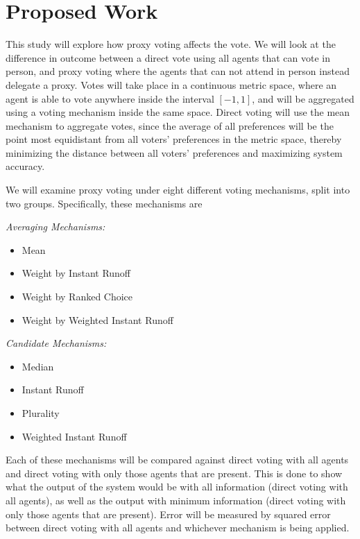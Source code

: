\section{Proposed Work}\label{sec:contribution}
This study will explore how proxy voting affects the vote.
We will look at the difference in outcome between a direct vote using all agents that
can vote in person, and proxy voting where the agents that can not attend in person
instead delegate a proxy.
Votes will take place in a continuous metric space, where an agent is able to vote
anywhere inside the interval $[-1, 1]$, and will be aggregated using a voting
mechanism inside the same space.
Direct voting will use the mean mechanism to aggregate votes, since the average of
all preferences will be the point most equidistant from all voters' preferences in
the metric space, thereby minimizing the distance between all voters' preferences and
maximizing system accuracy.

We will examine proxy voting under eight different voting mechanisms, split into two
groups.
Specifically, these mechanisms are\\
\begin{samepage}
    \textit{Averaging Mechanisms:}
    \begin{itemize}
        \item Mean
        \item Weight by Instant Runoff
        \item Weight by Ranked Choice
        \item Weight by Weighted Instant Runoff
    \end{itemize}
    \textit{Candidate Mechanisms:}
    \begin{itemize}
        \item Median
        \item Instant Runoff
        \item Plurality
        \item Weighted Instant Runoff
    \end{itemize}
\end{samepage}
Each of these mechanisms will be compared against direct voting with all agents and
direct voting with only those agents that are present.
This is done to show what the output of the system would be with all information
(direct voting with all agents), as well as the output with minimum information
(direct voting with only those agents that are present).
Error will be measured by squared error between direct voting with all agents and
whichever mechanism is being applied.

